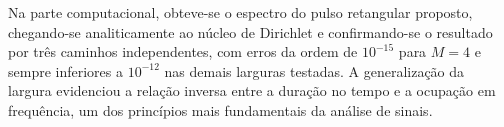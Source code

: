 \documentclass[
    12pt,
    openright,
    oneside,
    a4paper,
    chapter=TITLE,
    section=TITLE,
    brazil
]{abntex2}
\begin{document}
Na parte computacional, obteve-se o espectro do pulso retangular proposto, chegando-se
analiticamente ao núcleo de Dirichlet e confirmando-se o resultado por três caminhos
independentes, com erros da ordem de $10^{-15}$ para $M = 4$ e sempre inferiores a
$10^{-12}$ nas demais larguras testadas. A generalização da largura evidenciou a
relação inversa entre a duração no tempo e a ocupação em frequência, um dos princípios
mais fundamentais da análise de sinais.

\newpage

\postextual

\end{document}
